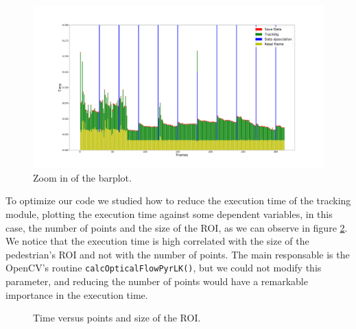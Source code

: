 \begin{figure}[H]
\centering         
\includegraphics[width=0.9\linewidth]{graphicsRearrange/temps/timeSpecfici.png}
\caption{Zoom in of the barplot.} \label{timing2}
\end{figure}

To optimize our code we studied how to reduce the execution time of the tracking module, plotting the execution time against some dependent variables, in this case, the number of points and the size of the ROI, as we can observe in figure \ref{timing2}. We notice that the execution time is high correlated with the size of the pedestrian's ROI and not with the number of points. The main responsable is the OpenCV's routine \texttt{calcOpticalFlowPyrLK()}, but we could not modify this parameter, and reducing the number of points would have a remarkable importance in the execution time. 



\begin{figure}[H]
		
\centering

\caption{Time versus points and size of the ROI.}
\label{timing2}
\end{figure}
